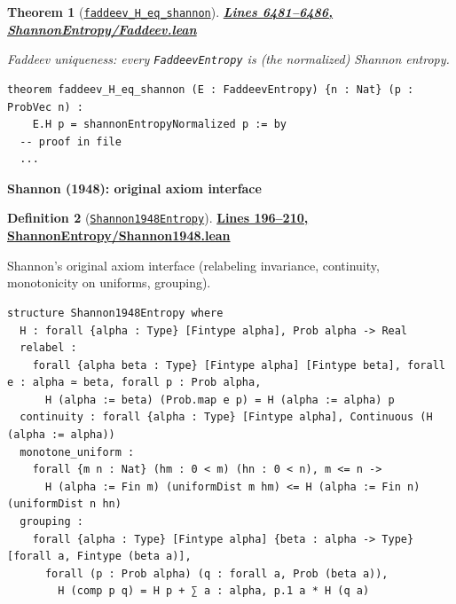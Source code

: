 \documentclass[11pt]{article}
\newtheorem{theorem}{Theorem}[section]
\theoremstyle{definition}
\newtheorem{definition}[theorem]{Definition}
\theoremstyle{remark}
\begin{document}
\begin{theorem}[\href{https://github.com/zariuq/ks-foundations-of-inference/blob/main/InformationTheory/ShannonEntropy/Faddeev.lean\#L6484}{\texttt{faddeev\_H\_eq\_shannon}}]
\textbf{\href{https://github.com/zariuq/ks-foundations-of-inference/blob/main/InformationTheory/ShannonEntropy/Faddeev.lean\#L6481-L6486}{Lines 6481--6486, ShannonEntropy/Faddeev.lean}}

Faddeev uniqueness: every \texttt{FaddeevEntropy} is (the normalized) Shannon entropy.
\end{theorem}

\begin{lstlisting}[caption={Faddeev uniqueness theorem (main result)}]
theorem faddeev_H_eq_shannon (E : FaddeevEntropy) {n : Nat} (p : ProbVec n) :
    E.H p = shannonEntropyNormalized p := by
  -- proof in file
  ...
\end{lstlisting}

\textbf{Shannon (1948): original axiom interface}

\begin{definition}[\href{https://github.com/zariuq/MeTTapedia/blob/main/lean/mettapedia/Mettapedia/InformationTheory/ShannonEntropy/Shannon1948.lean\#L196}{\texttt{Shannon1948Entropy}}]
\textbf{\href{https://github.com/zariuq/MeTTapedia/blob/main/lean/mettapedia/Mettapedia/InformationTheory/ShannonEntropy/Shannon1948.lean\#L196-L210}{Lines 196--210, ShannonEntropy/Shannon1948.lean}}

Shannon's original axiom interface (relabeling invariance, continuity, monotonicity on uniforms, grouping).
\end{definition}

\begin{lstlisting}[caption={Shannon 1948 axiom interface}]
structure Shannon1948Entropy where
  H : forall {alpha : Type} [Fintype alpha], Prob alpha -> Real
  relabel :
    forall {alpha beta : Type} [Fintype alpha] [Fintype beta], forall e : alpha ≃ beta, forall p : Prob alpha,
      H (alpha := beta) (Prob.map e p) = H (alpha := alpha) p
  continuity : forall {alpha : Type} [Fintype alpha], Continuous (H (alpha := alpha))
  monotone_uniform :
    forall {m n : Nat} (hm : 0 < m) (hn : 0 < n), m <= n ->
      H (alpha := Fin m) (uniformDist m hm) <= H (alpha := Fin n) (uniformDist n hn)
  grouping :
    forall {alpha : Type} [Fintype alpha] {beta : alpha -> Type} [forall a, Fintype (beta a)],
      forall (p : Prob alpha) (q : forall a, Prob (beta a)),
        H (comp p q) = H p + ∑ a : alpha, p.1 a * H (q a)
\end{lstlisting}
\end{document}
